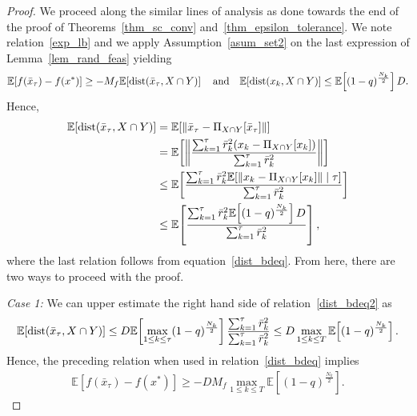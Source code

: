 \documentclass{article}
\def\dist{{\rm dist}}
\newcommand{\EXP}[1]
{\mathbb{E}\!\left[#1\right] }
\theoremstyle{plain}
\theoremstyle{definition}
\theoremstyle{remark}
\begin{document}
\begin{proof}
We proceed along the similar lines of analysis as done towards the end of the proof of Theorems~\ref{thm_sc_conv} and~\ref{thm_epsilon_tolerance}. We note relation~\eqref{exp_lb} and we apply Assumption~\ref{asum_set2} on the last expression of Lemma~\ref{lem_rand_feas} yielding
\begin{align}
    \EXP{f(\bar x_\tau) - f(x^*)} \geq -M_f \EXP{\dist(\bar x_{\tau}, X \cap Y)} \quad \text{and} \quad \EXP{\dist(x_{k},X \cap Y)} \leq \EXP{(1-q)^{\frac{N_{k}}{2}}} D . \label{dist_bdeq}
\end{align}
Hence,
\begin{align}
    \EXP{\dist(\bar x_{\tau}, X \cap Y)} &= \EXP{\|\bar x_{\tau} - \Pi_{X \cap Y} [\bar x_{\tau}] \|} \nonumber\\
    &= \EXP{\left\| \frac{\sum_{k=1}^\tau \bar r_k^2 (x_k - \Pi_{X \cap Y} [x_{k}])}{\sum_{k=1}^\tau \bar r_k^2} \right\|} \nonumber\\
    & \leq \EXP{\frac{\sum_{k=1}^\tau \bar r_k^2 \EXP{\|x_k - \Pi_{X \cap Y} [x_{k}]\| \mid \tau}}{\sum_{k=1}^\tau \bar r_k^2}} \nonumber\\
    &\leq \EXP{\frac{\sum_{k=1}^\tau \bar r_k^2 \EXP{(1-q)^{\frac{N_{k}}{2}}} D}{\sum_{k=1}^\tau \bar r_k^2}}, \label{dist_bdeq2}
\end{align}
where the last relation follows from equation~\eqref{dist_bdeq}. From here, there are two ways to proceed with the proof.

\textit{Case 1:} We can upper estimate the right hand side of relation~\eqref{dist_bdeq2} as
\begin{align*}
    \EXP{\dist(\bar x_{\tau}, X \cap Y)} \leq D \EXP{\max_{1 \leq k \leq \tau} (1-q)^{\frac{N_{k}}{2}}} \frac{\sum_{k=1}^\tau \bar r_k^2}{\sum_{k=1}^\tau \bar r_k^2} \leq D \max_{1 \leq k \leq T} \EXP{(1-q)^{\frac{N_{k}}{2}}} .
\end{align*}
Hence, the preceding relation when used in relation~\eqref{dist_bdeq} implies
\begin{align}
    \EXP{f(\bar x_\tau) - f(x^*)} \geq - D M_f \max_{1 \leq k \leq T} \EXP{(1-q)^{\frac{N_{k}}{2}}} . \label{dist_bdeq3}
\end{align}


\end{proof}
\end{document}
